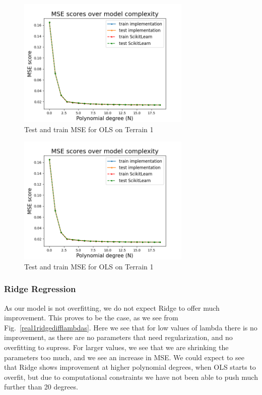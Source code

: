 \documentclass[twocolumn,10pt,cleanfoot]{asme2ej}
\begin{document}
\begin{figure} 
\centerline{\includegraphics[width=3.25in]{figure/real1msetraintest.png}}
\caption{Test and train MSE for OLS on Terrain 1}
\label{real1msetraintest}
\end{figure}
\begin{figure} 
\centerline{\includegraphics[width=3.25in]{figure/real1msetraintest.png}}
\caption{Test and train MSE for OLS on Terrain 1}
\label{real1msetraintest}
\end{figure}

\subsubsection{Ridge Regression}

As our model is not overfitting, we do not expect Ridge to offer much improvement. This proves to be the case, as we see from Fig.~\ref{real1ridgedifflambdas}. Here we see that for low values of lambda there is no improvement, as there are no parameters that need regularization, and no overfitting to supress. For larger values, we see that we are shrinking the parameters too much, and we see an increase in MSE. We could expect to see that Ridge shows improvement at higher polynomial degrees, when OLS starts to overfit, but due to computational constraints we have not been able to push much further than 20 degrees.
\end{document}
